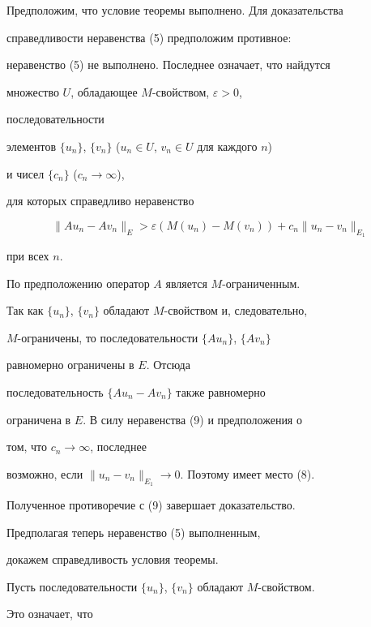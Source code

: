 \begin{pf} 


Предположим, что условие теоремы выполнено. Для доказательства  


справедливости неравенства (5) предположим противное: 


неравенство (5) не выполнено. Последнее означает, что найдутся  


множество $U$, обладающее $M$-свойством, $\varepsilon>0$, 


последовательности  


элементов $\{u_n\}$, $\{v_n\}$ ($u_n\in U$, $v_n\in U$ для каждого $n$) 


и чисел $\{c_n\}$ ($c_n\to\infty$),  


для которых справедливо неравенство 


\begin{equation} 


\|A u_n-A v_n\|_E>\varepsilon(M(u_n)-M(v_n))+ 


c_n\|u_n-v_n\|_{E_1} 


\end{equation} 


при всех $n$. 


 


По предположению оператор $A$ является $M$-ограниченным. 


Так как $\{u_n\}$, $\{v_n\}$ обладают $M$-свойством и, следовательно, 


$M$-ограничены, то последовательности $\{A{}u_n\}$, $\{A{}v_n\}$ 


равномерно ограничены в $E$. Отсюда 


последовательность $\{A{}u_n-A{}v_n\}$ также равномерно  


ограничена в $E$. В силу неравенства (9) и предположения о 


том, что $c_n\to\infty$, последнее  


возможно, если $\|u_n-v_n\|_{E_1}\to0$. Поэтому имеет место (8). 


Полученное противоречие с (9) завершает доказательство. 


 


Предполагая теперь неравенство (5) выполненным,  


докажем справедливость условия теоремы. 


Пусть последовательности $\{u_n\}$, $\{v_n\}$ обладают $M$-свойством. 


Это означает, что 



\end{pf}
